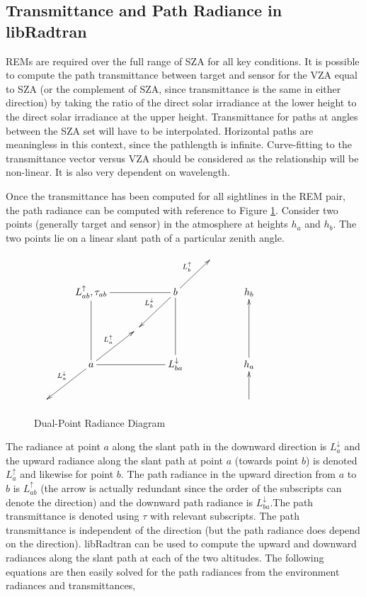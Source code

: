 
\subsection{Transmittance and Path Radiance in libRadtran\label{sub:libRadtranRocks}}

REMs are required over the full range of SZA for all key conditions.
It is possible to compute the path transmittance between target and
sensor for the VZA equal to SZA (or the complement of SZA, since transmittance
is the same in either direction) by taking the ratio of the direct
solar irradiance at the lower height to the direct solar irradiance
at the upper height. Transmittance for paths at angles between the
SZA set will have to be interpolated. Horizontal paths are meaningless
in this context, since the pathlength is infinite. Curve-fitting to
the transmittance vector versus VZA should be considered as the relationship
will be non-linear. It is also very dependent on wavelength.

Once the transmittance has been computed for all sightlines in the
REM pair, the path radiance can be computed with reference to Figure
\ref{fig:Dual-Point-Radiance-Diagram}. Consider two points (generally
target and sensor) in the atmosphere at heights $h_{a}$ and $h_{b}$.
The two points lie on a linear slant path of a particular zenith angle.

\begin{figure}
\begin{centering}
$\,\,\,\,\xymatrix{ &  &  &  & \,\\
 & L_{ab}^{\uparrow},\tau_{ab}\ar@{-}[rr]\ar@{-}[dd] &  & b\ar[dl]_{L_{b}^{\downarrow}}\ar[ur]^{L_{b}^{\uparrow}} &  & h_{b}\\
 &  & \,\\
 & a\ar[dl]_{L_{a}^{\downarrow}}\ar[ur]^{L_{a}^{\uparrow}} &  & L_{ba}^{\downarrow}\ar@{-}[ll]\ar@{-}[uu] &  & h_{a}\ar[uu]\\
\, &  &  &  &  & \ar[u]
}
$
\par\end{centering}

\protect\caption{Dual-Point Radiance Diagram\label{fig:Dual-Point-Radiance-Diagram}}
\end{figure}


The radiance at point $a$ along the slant path in the downward direction
is $L_{a}^{\downarrow}$ and the upward radiance along the slant path
at point $a$ (towards point $b$) is denoted $L_{a}^{\uparrow}$
and likewise for point $b$. The path radiance in the upward direction
from $a$ to $b$ is $L_{ab}^{\uparrow}$ (the arrow is actually redundant
since the order of the subscripts can denote the direction) and the
downward path radiance is $L_{ba}^{\downarrow}$.The path transmittance
is denoted using $\tau$ with relevant subscripts. The path transmittance
is independent of the direction (but the path radiance does depend
on the direction). libRadtran can be used to compute the upward and
downward radiances along the slant path at each of the two altitudes.
The following equations are then easily solved for the path radiances
from the environment radiances and transmittances,


